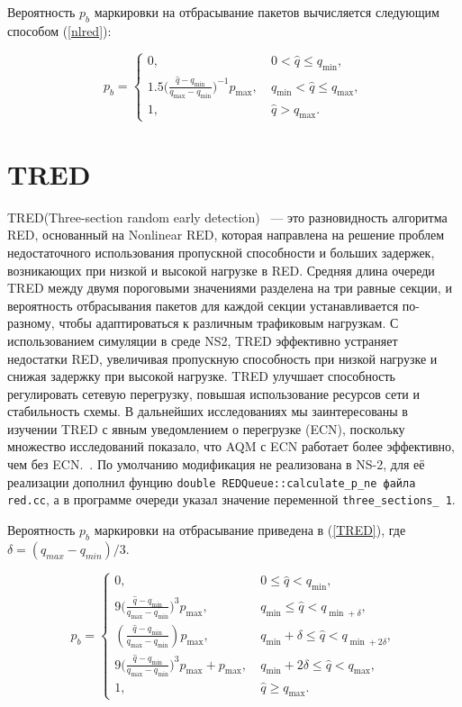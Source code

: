 Вероятность $p_{b}$ маркировки на
отбрасывание пакетов вычисляется следующим способом (\ref{nlred}):

\begin{equation}
\label{nlred}
p_{b} = \begin{cases}
        0, &  \ 0 < \hat{q} \leqslant q_{\min},
        \\
        1.5({\frac{\hat{q} - q_{\min}}{q_{\max} - q_{\min}})^{-1}} {p_{\max}}, & \ q_{\min} < \hat{q} \leqslant q_{\max},
        \\
        1, &  \ \hat{q} > q_{\max}.
\end{cases}
\end{equation}



\section{TRED}
\label{chap2:sec7}

TRED(Three-section random early detection) ~--- это разновидность алгоритма RED, основанный на Nonlinear RED, которая направлена на решение проблем недостаточного использования пропускной способности и больших задержек, возникающих при низкой и высокой нагрузке в RED. 
Средняя длина очереди TRED между двумя пороговыми значениями разделена на три равные секции, и вероятность отбрасывания пакетов для каждой секции устанавливается по-разному, чтобы адаптироваться к различным трафиковым нагрузкам. С использованием симуляции в среде NS2, TRED эффективно устраняет недостатки RED, увеличивая пропускную способность при низкой нагрузке и снижая задержку при высокой нагрузке. TRED улучшает способность регулировать сетевую перегрузку, повышая использование ресурсов сети и стабильность схемы. В дальнейших исследованиях мы заинтересованы в изучении TRED с явным уведомлением о перегрузке (ECN), поскольку множество исследований показало, что AQM с ECN работает более эффективно, чем без ECN.~\cite{TRED}. По умолчанию модификация не реализована в NS-2, для её реализации дополнил фунцию \verb|double REDQueue::calculate_p_ne файла red.cc|, а в программе очереди указал значение переменной \verb|three_sections_ 1|. 

Вероятность $p_{b}$ маркировки на отбрасывание приведена в (\ref{TRED}), где $ \delta = (q_{max} - q_{min})/3 $.

\begin{equation}
\label{TRED}
p_{b} = \begin{cases}
        0, &  \ 0 \leqslant \hat{q} < q_{\min},
        \\
        9({\frac{\hat{q} - q_{\min}}{q_{\max} - q_{\min}})^3} {p_{\max}}, & \ q_{\min} \leqslant  \hat{q} < q_{\min + \delta},
        \\
        (\frac{\hat{q} - q_{\min}}{q_{\max} - q_{\min}}) {p_{\max}}, & \ q_{\min} + \delta \leqslant \hat{q} < q_{\min + 2\delta},
        \\
        9({\frac{\hat{q} - q_{\min}}{q_{\max} - q_{\min}})^3} {p_{\max}} + {p_{\max}}, & \ q_{\min} +2\delta \leqslant  \hat{q} < q_{\max},
        \\
        1, &  \ \hat{q} \geqslant q_{\max}.
\end{cases}
\end{equation} 


